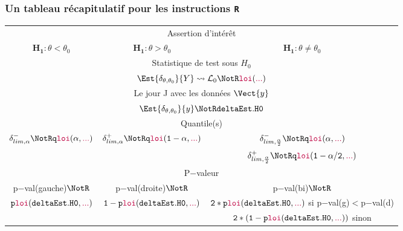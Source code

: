 \documentclass[11pt]{beamer}
\begin{document}
\begin{frame}
\frametitle{Un tableau récapitulatif pour les instructions \texttt{R}}
{\small \hspace*{-.3cm} \begin{tabular}{|c|c|c|}
\hline
 \multicolumn{3}{|c|}{\color{blue} \large Assertion d'intérêt} \\ 
$\mathbf{H_1}: \theta<\theta_0$ & $\mathbf{H_1}: \theta>\theta_0$&$\mathbf{H_1}: \theta\neq\theta_0$ \\
\hline \hline
\multicolumn{3}{|c|}{\color{blue} \large Statistique de test sous $H_0$} \\
\multicolumn{3}{|c|}{$\Est{\delta_{\theta,\theta_0}}{Y} \leadsto \mathcal{L}_0 \NotR \mathtt{{\color{purple}loi}({\color{purple}...})}$} \\
\hline \hline
\multicolumn{3}{|c|}{\color{blue} \large Le jour J avec les données $\Vect{y}$} \\ \multicolumn{3}{|c|}{$\Est{\delta_{\theta,\theta_0}}{y} \NotR \mathtt{deltaEst.H0}$} \\
\hline \hline
\multicolumn{3}{|c|}{\color{blue} \large Quantile(s)} \\
$\delta_{lim,\alpha}^- \NotR \mathtt{q{\color{purple}loi}(\alpha,{\color{purple}...})}$ &  $\delta_{lim,\alpha}^+ \NotR \mathtt{q{\color{purple}loi}(1-\alpha,{\color{purple}...})}$& $\delta_{lim,\frac{\alpha}2}^- \NotR \mathtt{q{\color{purple}loi}(\alpha,{\color{purple}...})}$\\
&& $\delta_{lim,\frac{\alpha}2}^+ \NotR \mathtt{q{\color{purple}loi}(1-\alpha/2,{\color{purple}...})}$\\
\hline \hline
\multicolumn{3}{|c|}{\color{blue} \large P$-$valeur}\\
p$-$val(gauche)$\NotR$&p$-$val(droite)$\NotR$ & p$-$val(bi)$\NotR$ \\
{\scriptsize$\mathtt{p{\color{purple}loi}(deltaEst.H0,{\color{purple}...})}$}&{\scriptsize $\mathtt{1-p{\color{purple}loi}(deltaEst.H0,{\color{purple}...})}$} & 
{\tiny$ \mathtt{2*p{\color{purple}loi}(deltaEst.H0,{\color{purple}...})}$ si p$-$val(g)$<$p$-$val(d)} \\
&& {\tiny$ \mathtt{2*(1-p{\color{purple}loi}(deltaEst.H0,{\color{purple}...}))}$ sinon}\\
\hline
\end{tabular}}
\end{frame}
\end{document}
